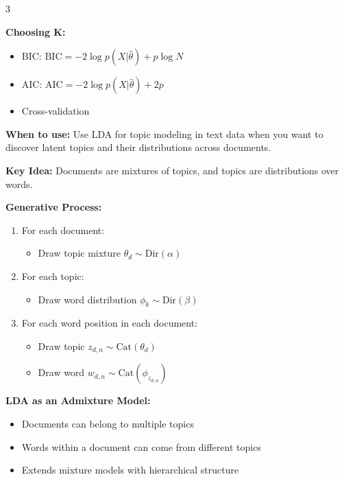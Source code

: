 \documentclass[10pt,landscape]{article}
\begin{document}
\begin{multicols}{3}
\begin{tcolorbox}[breakable, title=6.2 Gaussian Mixture Models (GMM), colback=mixture]
\textbf{Choosing K:}
\begin{itemize}[leftmargin=*,noitemsep,topsep=0pt]
    \item BIC: $\text{BIC} = -2\log p(X|\hat{\theta}) + p\log N$
    \item AIC: $\text{AIC} = -2\log p(X|\hat{\theta}) + 2p$
    \item Cross-validation
\end{itemize}
\end{tcolorbox}

\begin{tcolorbox}[breakable, title=6.3 Latent Dirichlet Allocation (LDA), colback=mixture]
\textbf{When to use:} Use LDA for topic modeling in text data when you want to discover latent topics and their distributions across documents.

\textbf{Key Idea:} Documents are mixtures of topics, and topics are distributions over words.

\textbf{Generative Process:}
\begin{enumerate}[leftmargin=*,noitemsep,topsep=0pt]
    \item For each document:
    \begin{itemize}[leftmargin=*,noitemsep]
        \item Draw topic mixture $\theta_d \sim \text{Dir}(\alpha)$
    \end{itemize}
    \item For each topic:
    \begin{itemize}[leftmargin=*,noitemsep]
        \item Draw word distribution $\phi_k \sim \text{Dir}(\beta)$
    \end{itemize}
    \item For each word position in each document:
    \begin{itemize}[leftmargin=*,noitemsep]
        \item Draw topic $z_{d,n} \sim \text{Cat}(\theta_d)$
        \item Draw word $w_{d,n} \sim \text{Cat}(\phi_{z_{d,n}})$
    \end{itemize}
\end{enumerate}

\textbf{LDA as an Admixture Model:}
\begin{itemize}[leftmargin=*,noitemsep,topsep=0pt]
    \item Documents can belong to multiple topics
    \item Words within a document can come from different topics
    \item Extends mixture models with hierarchical structure
\end{itemize}


\end{tcolorbox}
\end{multicols}
\end{document}

